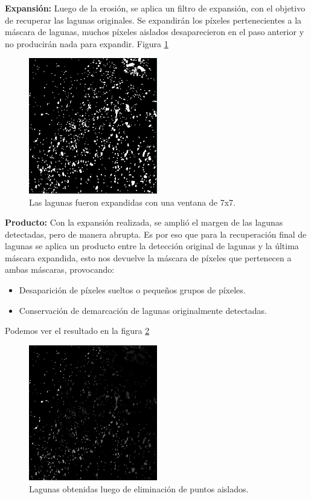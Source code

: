 \documentclass[10pt,a4paper, twoside]{report}
\begin{document}
		\textbf{Expansión:} Luego de la erosión, se aplica un filtro de expansión, con el objetivo de recuperar las lagunas originales. Se expandirán los píxeles pertenecientes a la máscara de lagunas, muchos píxeles aislados desaparecieron en el paso anterior y no producirán nada para expandir. Figura \ref{lagunasExpandidas}
		
\begin{figure}[H]
   \centering      
   \includegraphics[width=0.5\textwidth]{imagenes/lagunasExpandidas.jpg}
 \caption{Las lagunas fueron expandidas con una ventana de 7x7.}
 \label{lagunasExpandidas}
\end{figure}
		
		\textbf{Producto:} Con la expansión realizada, se amplió el margen de las lagunas detectadas, pero de manera abrupta. Es por eso que para la recuperación final de lagunas se aplica un producto entre la detección original de lagunas y la última máscara expandida, esto nos devuelve la máscara de píxeles que pertenecen a ambas máscaras, provocando:
		
		\begin{itemize}
			\item Desaparición de píxeles sueltos o pequeños grupos de píxeles.
			\item Conservación de demarcación de lagunas originalmente detectadas.
		\end{itemize}		
		
		Podemos ver el resultado en la figura \ref{lagunasDetectadas}

\begin{figure}[H]
   \centering      
   \includegraphics[width=0.5\textwidth]{imagenes/lagunasDetectadas.jpg}
 \caption{Lagunas obtenidas luego de eliminación de puntos aislados.}
 \label{lagunasDetectadas}
\end{figure}		
		
\end{document}
